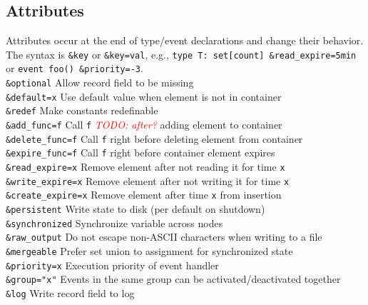 \documentclass[10pt,landscape]{article}
\def\todo#1{\textit{\textcolor{red}{TODO: #1}}}
\begin{document}
\begin{multicols*}{2}
\subsection*{Attributes}
Attributes occur at the end of type/event declarations and change their
behavior. The syntax is \verb|&key| or \verb|&key=val|, e.g.,
\verb|type T: set[count] &read_expire=5min| or
\verb|event foo() &priority=-3|.\\

\verb|&optional| \dotfill Allow record field to be missing\\
\verb|&default=x| \dotfill Use default value when element is not in container\\
\verb|&redef| \dotfill Make constants redefinable\\
\verb|&add_func=f| \dotfill Call \verb|f| \todo{after?} adding element to
  container\\
\verb|&delete_func=f| \dotfill Call \verb|f| right before deleting element from
  container \\
\verb|&expire_func=f| \dotfill Call \verb|f| right before container element 
  expires\\
\verb|&read_expire=x| \dotfill Remove element after not reading it for time
  \verb|x|\\
\verb|&write_expire=x| \dotfill Remove element after not writing it for time
  \verb|x|\\
\verb|&create_expire=x| \dotfill Remove element after time \verb|x| from
  insertion\\
\verb|&persistent| \dotfill Write state to disk (per default on shutdown)\\
\verb|&synchronized| \dotfill Synchronize variable across nodes\\
\verb|&raw_output| \dotfill Do not escape non-ASCII characters when writing to
a file\\
\verb|&mergeable| \dotfill Prefer set union to assignment for synchronized
  state\\
\verb|&priority=x| \dotfill Execution priority of event handler\\
\verb|&group="x"| \dotfill Events in the same group can be
activated/deactivated together \\
\verb|&log| \dotfill Write record field to log \\


\end{multicols*}
\end{document}
